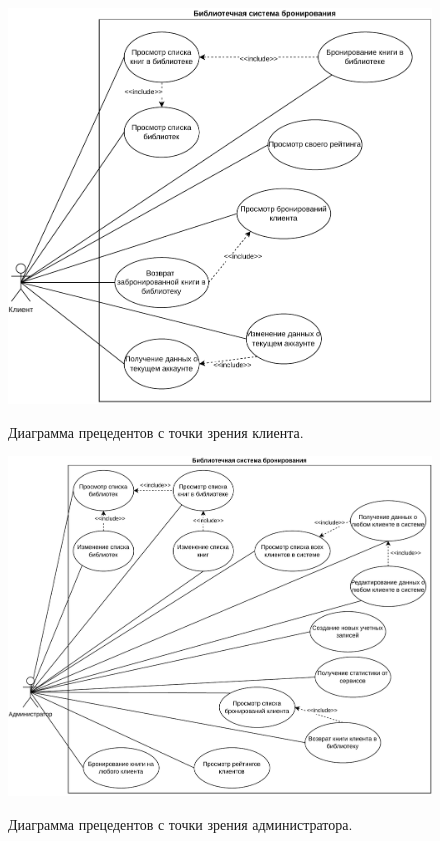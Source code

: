 \documentclass[a4paper, 12pt]{article}
\begin{document}
\begin{large}
\begin{figure}[h]
	\begin{center}
		{\includegraphics[scale = 0.66]{UseCaseClient}}
		\caption{Диаграмма прецедентов с точки зрения клиента.}
		\label{fig:use-case-client}
	\end{center}
\end{figure}

\begin{figure}[h!]
	\begin{center}
		{\includegraphics[scale = 0.66]{UseCaseAdmin}}
		\caption{Диаграмма прецедентов с точки зрения администратора.}
		\label{fig:use-case-admin}
	\end{center}
\end{figure}


\end{large}
\end{document}
